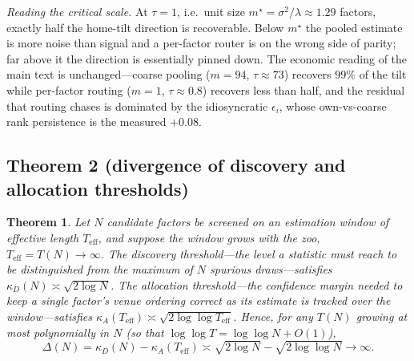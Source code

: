 \documentclass[12pt]{article}
\theoremstyle{plain}
\newtheorem{theorem}{Theorem}
\theoremstyle{definition}
\begin{document}
\medskip\noindent\emph{Reading the critical scale.} At $\tau=1$, i.e.\ unit size
$m^\star=\sigma^2/\lambda\approx1.29$ factors, exactly half the home-tilt
direction is recoverable. Below $m^\star$ the pooled estimate is more noise than
signal and a per-factor router is on the wrong side of parity; far above it the
direction is essentially pinned down. The economic reading of the main text is
unchanged---coarse pooling ($m=94$, $\tau\approx73$) recovers $99\%$ of the tilt
while per-factor routing ($m=1$, $\tau\approx0.8$) recovers less than half, and
the residual that routing chases is dominated by the idiosyncratic $\epsilon_i$,
whose own-vs-coarse rank persistence is the measured $+0.08$.

\subsection{Theorem 2 (divergence of discovery and allocation thresholds)}

\begin{theorem}
Let $N$ candidate factors be screened on an estimation window of effective length
$T_{\mathrm{eff}}$, and suppose the window grows with the zoo, $T_{\mathrm{eff}}
=T(N)\to\infty$. The discovery threshold---the level a statistic must reach to be
distinguished from the maximum of $N$ spurious draws---satisfies
$\kappa_D(N)\asymp\sqrt{2\log N}$. The allocation threshold---the confidence
margin needed to keep a single factor's venue ordering correct as its estimate is
tracked over the window---satisfies $\kappa_A(T_{\mathrm{eff}})\asymp
\sqrt{2\log\log T_{\mathrm{eff}}}$. Hence, for any $T(N)$ growing at most
polynomially in $N$ (so that $\log\log T=\log\log N+O(1)$),
\[
\Delta(N)=\kappa_D(N)-\kappa_A(T_{\mathrm{eff}})\asymp
\sqrt{2\log N}-\sqrt{2\log\log N}\to\infty.
\]
\end{theorem}
\end{document}

